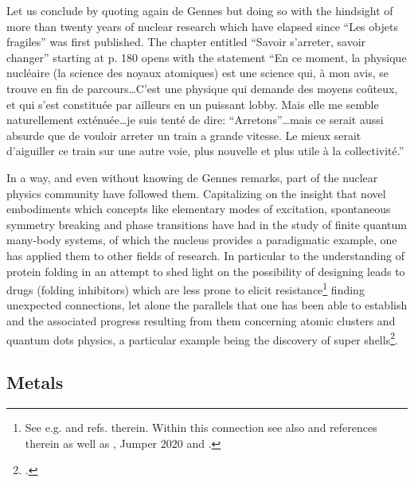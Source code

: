  Let us conclude by quoting again de Gennes but doing so with the hindsight of more than twenty years of nuclear research which have elapsed since ``Les objets fragiles'' was first published. The chapter entitled  ``Savoir s'arreter, savoir changer'' starting at p. 180 opens with the statement ``En ce moment, la physique nucl\'eaire (la science des noyaux atomiques) est une science qui, \`a mon avis, se trouve en fin de parcours\dots C'est une physique qui demande des moyens co\^uteux, et qui s'est constitu\'ee par ailleurs en un puissant lobby. Mais elle me semble naturellement ext\'enu\'ee\dots je suis tent\'e de dire: ``Arretons''\dots mais ce serait aussi absurde que de vouloir arreter un train a grande vitesse. Le mieux serait d'aiguiller ce train sur une autre voie, plus nouvelle et plus utile \`a la collectivit\'e.''


In a way, and even without knowing de Gennes remarks, part of the nuclear physics community have followed them. Capitalizing on the insight that novel embodiments which concepts like elementary modes of excitation, spontaneous symmetry breaking and phase transitions have had in the study of finite quantum many-body systems, of which the nucleus provides a paradigmatic example, one has applied them to other fields of research. In particular to the understanding of protein folding in an attempt to shed light on the possibility of designing leads to  drugs (folding inhibitors) which are less prone to elicit resistance\footnote{See e.g. \cite{Broglia:05,Rosner:17} and refs. therein. Within this connection see also \cite{Bergasa:20} and references therein as well as \cite{Service:20} \cite{reviewservice}\cite{reviewservice},  Jumper 2020 and \cite{Broglia:01b}.} finding  unexpected connections, let alone  the parallels that one has been able to establish and the associated progress resulting from them concerning atomic clusters  and quantum dots physics, a particular example being the discovery of super shells\footnote{\cite{Pedersen:91,deHeer:87,Brack:93,Pacheco:91,Lipparini:03,Martin:94,Bjornholm:94}.}.







\subsection{Metals}\label{App3A2}
